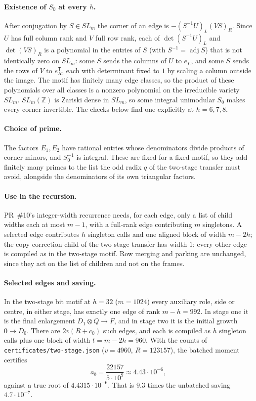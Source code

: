 \documentclass[11pt]{article}
\theoremstyle{remark}\newtheorem*{remark}{Remark}
\begin{document}
\paragraph{Existence of $S_0$ at every $h$.} After conjugation by $S\in SL_m$ the corner of an edge is
$-(S^{-1}U)_L(VS)_R$. Since $U$ has full column rank and $V$ full row rank, each of $\det(S^{-1}U)_L$ and
$\det(VS)_R$ is a polynomial in the entries of $S$ (with $S^{-1}=\operatorname{adj}S$) that is not identically
zero on $SL_m$: some $S$ sends the columns of $U$ to $e_L$, and some $S$ sends the rows of $V$ to $e_R^{\mathsf T}$,
each with determinant fixed to $1$ by scaling a column outside the image. The motif has finitely many edge classes,
so the product of these polynomials over all classes is a nonzero polynomial on the irreducible variety $SL_m$.
$SL_m(\mathbb Z)$ is Zariski dense in $SL_m$, so some integral unimodular $S_0$ makes every corner invertible.
The checks below find one explicitly at $h=6,7,8$.

\paragraph{Choice of prime.} The factors $E_1,E_2$ have rational entries whose denominators divide products of
corner minors, and $S_0^{-1}$ is integral. These are fixed for a fixed motif, so they add finitely many primes to
the list the odd radix $q$ of the two-stage transfer must avoid, alongside the denominators of its own triangular
factors.

\paragraph{Use in the recursion.} PR~\#10's integer-width recurrence needs, for each edge, only a list of child
widths each at most $m-1$, with a full-rank edge contributing $m$ singletons. A selected edge contributes $h$
singleton calls and one aligned block of width $m-2h$; the copy-correction child of the two-stage transfer has
width $1$; every other edge is compiled as in the two-stage motif. Row merging and parking are unchanged, since
they act on the list of children and not on the frames.

\paragraph{Selected edges and saving.} In the two-stage bit motif at $h=32$ ($m=1024$) every auxiliary role,
side or centre, in either stage, has exactly one edge of rank $m-h=992$. In stage one it is the final
enlargement $D_1\otimes Q\to F$, and in stage two it is the initial growth $0\to D_0$. There are $2v(R+c_0)$
such edges, and each is compiled as $h$ singleton calls plus one block of width $t=m-2h=960$. With the counts
of \texttt{certificates/two-stage.json} ($v=4960$, $R=123157$), the batched moment certifies
\[
 a_b=\frac{22157}{5\cdot10^{9}}\approx4.43\cdot10^{-6},
\]
against a true root of $4.4315\cdot10^{-6}$. That is $9.3$ times the unbatched saving $4.7\cdot10^{-7}$.
\end{document}
